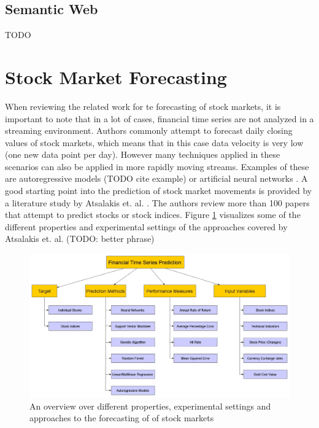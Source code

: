 \subsection{Semantic Web}
\label{subsec_semanticWeb}
TODO



\section{Stock Market Forecasting}
\label{sec_prediction}
When reviewing the related work for te forecasting of stock markets, it is important to note that in a lot of cases, financial time series are not analyzed in a streaming environment. Authors commonly attempt to forecast daily closing values of stock markets, which means that in this case data velocity is very low (one new data point per day). However many techniques applied in these scenarios can also be applied in more rapidly moving streams. Examples of these are autoregressive models (TODO cite example) or artificial neural networks \cite{gama2010knowledge}. \newline
A good starting point into the prediction of stock market movements is provided by a literature study by Atsalakis et. al. \cite{atsalakis2009surveying}. The authors review more than 100 papers that attempt to predict stocks or stock indices. Figure \ref{fig_financialTimeSeriesPredictionOverview} visualizes some of the different properties and experimental settings of the approaches covered by Atsalakis et. al. (TODO: better phrase)

\begin{figure}[h]
	\centering
  	\includegraphics[width=\textwidth]{financialTimeSeriesPredictionOverview}
	\caption{An overview over different properties, experimental settings and approaches to the forecasting of of stock markets}
	\label{fig_financialTimeSeriesPredictionOverview}
\end{figure}

